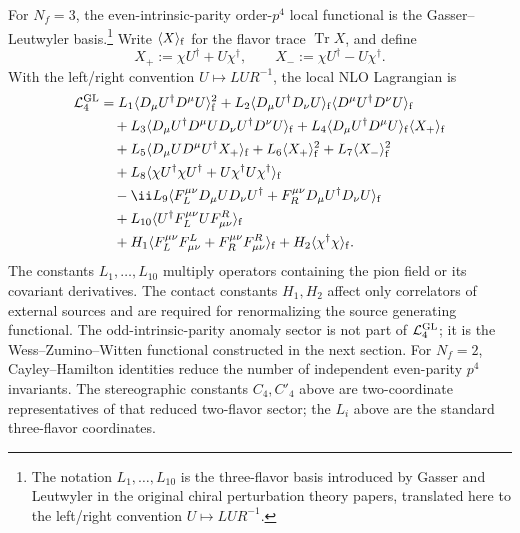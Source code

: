 For \(N_f=3\), the even-intrinsic-parity order-\(p^4\) local functional is the
Gasser--Leutwyler basis.\footnote{The notation \(L_1,\ldots,L_{10}\) is the
three-flavor basis introduced by Gasser and Leutwyler in the original chiral
perturbation theory papers, translated here to the left/right convention
\(U\mapsto LUR^{-1}\).}  Write \(\langle X\rangle_{\rm f}\) for the flavor
trace \(\operatorname{Tr}X\), and define
\[
  X_+ := \chi U^\dagger+U\chi^\dagger,
  \qquad
  X_- := \chi U^\dagger-U\chi^\dagger .
\]
With the left/right convention \(U\mapsto LUR^{-1}\), the local NLO
Lagrangian is
\begin{align}
  \mathcal L_4^{\rm GL}
  &=
  L_1\langle D_\mu U^\dagger D^\mu U\rangle_{\rm f}^2
  +
  L_2\langle D_\mu U^\dagger D_\nu U\rangle_{\rm f}
      \langle D^\mu U^\dagger D^\nu U\rangle_{\rm f}
  \notag\\
  &\quad
  +
  L_3\langle
    D_\mu U^\dagger D^\mu U
    D_\nu U^\dagger D^\nu U
  \rangle_{\rm f}
  +
  L_4\langle D_\mu U^\dagger D^\mu U\rangle_{\rm f}
      \langle X_+\rangle_{\rm f}
  \notag\\
  &\quad
  +
  L_5\langle D_\mu U D^\mu U^\dagger X_+\rangle_{\rm f}
  +
  L_6\langle X_+\rangle_{\rm f}^2
  +
  L_7\langle X_-\rangle_{\rm f}^2
  \notag\\
  &\quad
  +
  L_8\langle
    \chi U^\dagger\chi U^\dagger
    +U\chi^\dagger U\chi^\dagger
  \rangle_{\rm f}
  \notag\\
  &\quad
  -\ii L_9
  \langle
    F_L^{\mu\nu}D_\mu U D_\nu U^\dagger
    +F_R^{\mu\nu}D_\mu U^\dagger D_\nu U
  \rangle_{\rm f}
  \notag\\
  &\quad
  +
  L_{10}
  \langle U^\dagger F_L^{\mu\nu}U F^R_{\mu\nu}\rangle_{\rm f}
  \notag\\
  &\quad
  +
  H_1\langle F_L^{\mu\nu}F^L_{\mu\nu}
      +F_R^{\mu\nu}F^R_{\mu\nu}\rangle_{\rm f}
  +
  H_2\langle \chi^\dagger\chi\rangle_{\rm f}.
  \label{eq:gasser-leutwyler-l1-l10-basis}
\end{align}
The constants \(L_1,\ldots,L_{10}\) multiply operators containing the pion
field or its covariant derivatives.  The contact constants \(H_1,H_2\) affect
only correlators of external sources and are required for renormalizing the
source generating functional.  The odd-intrinsic-parity anomaly sector is not
part of \(\mathcal L_4^{\rm GL}\); it is the Wess--Zumino--Witten functional
constructed in the next section.  For \(N_f=2\), Cayley--Hamilton identities
reduce the number of independent even-parity \(p^4\) invariants.  The
stereographic constants \(C_4,C'_4\) above are two-coordinate representatives
of that reduced two-flavor sector; the \(L_i\) above are the standard
three-flavor coordinates.

